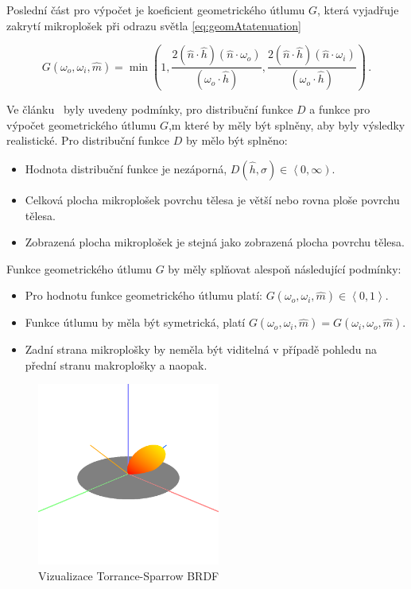 \documentclass[czech,master]{diploma}
\newcommand{\intervalcc}[2]{\left<{{#1},{#2}}\right>}
\newcommand{\intervalco}[2]{\left<{{#1},{#2}}\right)}
\newcommand{\uvec}[1]{\hat{#1}}
\newcommand{\normVec}{\uvec{n}}
\newcommand{\normMicroVec}{\uvec{m}}
\newcommand{\inVec}{\omega_{i}}
\newcommand{\outVec}{\omega_{o}}
\newcommand{\halfVec}{\uvec{h}}
\newcommand{\rough}{\sigma}
\begin{document}
Poslední část pro výpočet je koeficient geometrického útlumu \(G\), která vyjadřuje zakrytí mikroplošek při odrazu světla \hyperref[eq:geomAtatenuation]{\ref{eq:geomAtatenuation}}~\cite{BRDFOverview}

\begin{equation}\label{eq:geomAtatenuation}
  G(\outVec,\inVec, \normMicroVec)  =  \min \left( 1, \frac{2 ( \normVec \cdot \halfVec ) ( \normVec \cdot \outVec )
    }{ ( \outVec \cdot \halfVec ) },\frac{ 2 ( \normVec \cdot \halfVec ) ( \normVec \cdot \inVec ) }{ ( \outVec \cdot \halfVec ) } \right)\,.
\end{equation}


Ve článku~\cite{MicrofacetWalter} byly uvedeny podmínky, pro distribuční funkce \(D\) a  funkce pro výpočet geometrického útlumu \(G\),m které by měly být splněny, aby byly výsledky realistické. Pro distribuční funkce \(D\) by mělo být splněno:
\begin{itemize}
  \item Hodnota distribuční funkce je nezáporná, \(D(\halfVec,\rough) \in \intervalco{0}{\infty}\).
  \item Celková plocha mikroplošek povrchu tělesa je větší nebo rovna ploše povrchu tělesa.
  \item Zobrazená plocha mikroplošek je stejná jako zobrazená plocha povrchu tělesa.
\end{itemize}
Funkce geometrického útlumu \(G\) by měly splňovat alespoň následující podmínky:
\begin{itemize}
  \item Pro hodnotu funkce geometrického útlumu platí: \(G(\outVec, \inVec, \normMicroVec) \in \intervalcc{0}{1}\).
  \item Funkce útlumu by měla být symetrická, platí \(G(\outVec, \inVec, \normMicroVec) = G(\inVec, \outVec, \normMicroVec)\).
  \item Zadní strana mikroplošky by neměla být viditelná v případě pohledu na přední stranu makroplošky a naopak.
\end{itemize}

\begin{figure}[ht]%
  \centering\includegraphics[width=6cm]{Figures/visualizations/brdfTorranceSparrow.png}%
  \caption{Vizualizace Torrance-Sparrow BRDF}%
  \label{fig:torranceSparrowBRDFRender}%
\end{figure}
\end{document}
